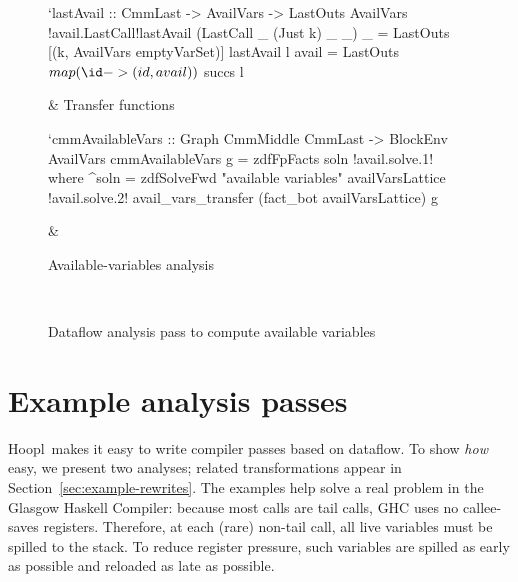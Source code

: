 \documentclass[blockstyle,preprint,natbib,nocopyrightspace]{sigplanconf}
\newcommand\ourlib{Hoopl}  %
\def\baselinestretch{0.8}\tiny
\def\baselinestretch{0.8}\tiny
\newcommand\secref[1]{Section~\ref{sec:#1}}
\newcommand\seclabel[1]{\label{sec:#1}}
\newcommand\figlabel[1]{\label{fig:#1}}
\begin{document}
\begin{figure*}
\begin{codetable}
\begin{code}
`lastAvail :: CmmLast -> AvailVars -> LastOuts AvailVars
!avail.LastCall!lastAvail (LastCall _ (Just k) _ _) _ = LastOuts [(k, AvailVars emptyVarSet)]
lastAvail l avail = LastOuts $ map (\id -> (id, avail)) $ succs l
\end{code}
\B
& Transfer \mbox{functions}\\
\hline

\T
\begin{code}
`cmmAvailableVars :: Graph CmmMiddle CmmLast -> BlockEnv AvailVars
cmmAvailableVars g = zdfFpFacts soln
!avail.solve.1!  where ^soln = zdfSolveFwd "available variables" availVarsLattice 
!avail.solve.2!                 avail_vars_transfer (fact_bot availVarsLattice) g
\end{code}
\B
& %
\def\baselinestretch{0.8}\hspace{-0.3in}\parbox{1.6in}{\center Available-variables analysis}
\\

\end{codetable}
\caption{Dataflow analysis pass to compute available variables}
\figlabel{avail-all}
\figlabel{avail}
\figlabel{avail-lattice}
\figlabel{avail-gen-kill}
\figlabel{avail-transfers}
\figlabel{avail-running}
\end{figure*}

\section{Example analysis passes}

\seclabel{example-analyses}


\ourlib\
makes it easy to write compiler passes based on dataflow.
To show \emph{how} easy, we present
two analyses;
related transformations appear in \secref{example-rewrites}. 
The examples help solve a real problem in the Glasgow Haskell
Compiler:
because most calls are tail calls, GHC uses no 
callee-saves registers.
Therefore, at each (rare) non-tail call, all live
variables must be spilled to the stack.
\ifcutting\else
To reduce register pressure,
such variables are spilled as early as possible and reloaded as late as
possible. 
\fi
\end{document}
